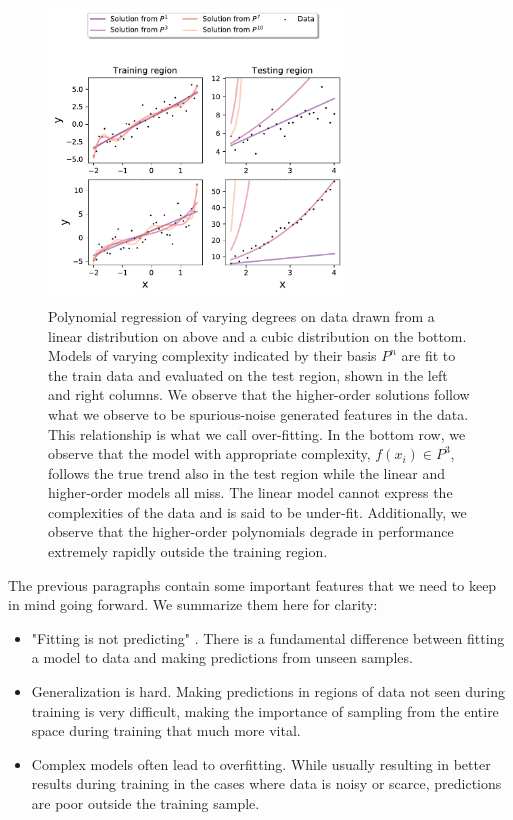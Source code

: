 \begin{figure}
\centering
\includegraphics[width=0.7\textwidth, height=8cm]{../figures/y_distr.pdf}
\caption[Illustrating over-fitting with polynomial regression]{Polynomial regression of varying degrees on data drawn from a linear distribution on above and a cubic distribution on the bottom. Models of varying complexity indicated by their basis $P^n$ are fit to the train data and evaluated on the test region, shown in the left and right columns. We observe that the higher-order solutions follow what we observe to be spurious-noise generated features in the data. This relationship is what we call over-fitting. In the bottom row, we observe that the model with appropriate complexity, $f(x_i) \in P^3$, follows the true trend also in the test region while the linear and higher-order models all miss. The linear model cannot express the complexities of the data and is said to be under-fit. Additionally, we observe that the higher-order polynomials degrade in performance extremely rapidly outside the training region.}\label{fig:overfit}
\end{figure}

The previous paragraphs contain some important features that we need to keep in mind going forward. We summarize them here for clarity: 
\begin{itemize}
\item "Fitting is not predicting" \cite{Mehta2019}. There is a fundamental difference between fitting a model to data and making predictions from unseen samples. \\
\item Generalization is hard. Making predictions in regions of data not seen during training is very difficult, making the importance of sampling from the entire space during training that much more vital. \\
\item Complex models often lead to overfitting. While usually resulting in better results during training in the cases where data is noisy or scarce, predictions are poor outside the training sample. 
\end{itemize}
